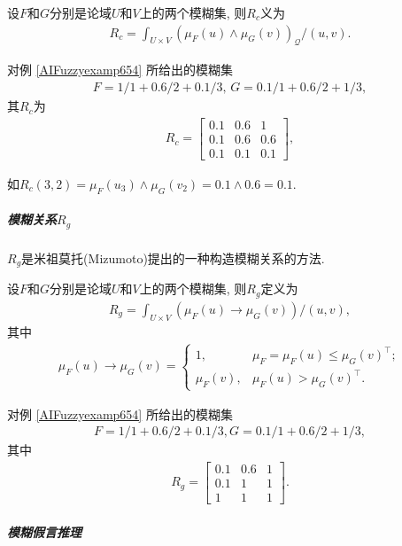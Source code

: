 设$F$和$G$分别是论域$U$和$V$上的两个模糊集, 则$R_c$义为
\begin{align*}
  R_{c}=\int_{U \times V}\left(\mu_{F}(u) \wedge \mu_{G}(v)\right)_{\mathcal{Q}} /(u, v).
\end{align*}
\begin{example}
对例 \ref{AIFuzzyexamp654} 所给出的模糊集
\begin{align*}
    F=1/1+0.6/2+0.1/3,\, G=0.1/1+0.6/2+1/3,
\end{align*}
其$R_c$为
\begin{align*}
    R_{c}=\left[\begin{array}{ccc}{0.1} & {0.6} & {1} \\
    {0.1} & {0.6} & {0.6} \\ {0.1} & {0.1} & {0.1}\end{array}\right],
\end{align*}
\vspace{-0.2cm}
\end{example}
如$R_{c}(3,2)=\mu_{F}\left(u_{3}\right) \wedge \mu_{G}\left(v_{2}\right)=0.1 \wedge 0.6=0.1$.
\subparagraph{模糊关系$R_g$}
$R_g$是米祖莫托(Mizumoto)提出的一种构造模糊关系的方法.

设$F$和$G$分别是论域$U$和$V$上的两个模糊集, 则$R_g$定义为
\begin{align*}
    R_{g}=\int_{U \times V}\left(\mu_{F}(u) \rightarrow \mu_{G}(v)\right) /(u, v),
\end{align*}
其中
\begin{align*}
  \mu_{F}(u) \rightarrow \mu_{G}(v)=
  \left\{
  \begin{array}{ll}
  {1}, & \mu_{F}= \mu_{F}(u) \leq \mu_{G}(v)^{\top};\\
  \mu_{F}(v), &  \mu_{F}(u)>\mu_{G}(v) ^{\top}.
  \end{array}
  \right.
\end{align*}
\begin{example}
对例 \ref{AIFuzzyexamp654} 所给出的模糊集
\begin{align*}
    F=1/1+0.6/2+0.1/3, 
    G=0.1/1+0.6/2+1/3,
\end{align*}
其中
\begin{align*}
    R_{g}=\left[
    \begin{array}{ccc}
    {0.1} & {0.6} & {1} \\
    {0.1} & {1} & {1} \\
    {1} & {1} & {1}
    \end{array}\right].
\end{align*}
\vspace{-0.3cm}
\end{example}
\subparagraph{模糊假言推理}

